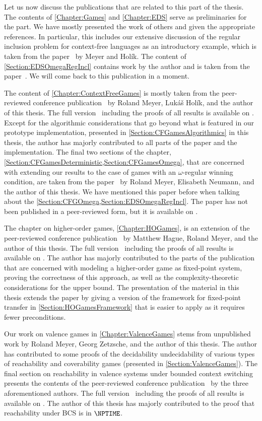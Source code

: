 \documentclass[../../diss.tex]{subfiles}
\begin{document}
Let us now discuss the publications that are related to this part of the thesis.
The contents of \cref{Chapter:Games} and \cref{Chapter:EDS} serve as preliminaries for the part.
We have mostly presented the work of others and given the appropriate references.
In particular, this includes our extensive discussion of the regular inclusion problem for context-free languages as an introductory example, which is taken from the paper~\cite{HolikM15} by Meyer and Holík.
The content of \cref{Section:EDSOmegaRegIncl} contains work by the author and is taken from the paper~\cite{MeyerMN17a}.
We will come back to this publication in a moment.

The content of \cref{Chapter:ContextFreeGames} is mostly taken from the peer-reviewed conference publication~\cite{HolikMM16} by Roland Meyer, Lukáš Holík, and the author of this thesis.
The full version~\cite{HolikMM16a} including the proofs of all results is available on \arXiv.
Except for the algorithmic considerations that go beyond what is featured in our prototype implementation, presented in \cref{Section:CFGamesAlgorithmics} in this thesis, the author has majorly contributed to all parts of the paper and the implementation.
The final two sections of the chapter, \cref{Section:CFGamesDeterministic,Section:CFGamesOmega}, that are concerned with extending our results to the case of games with an $\omega$-regular winning condition, are taken from the paper~\cite{MeyerMN17a} by Roland Meyer, Elisabeth Neumann, and the author of this thesis.
We have mentioned this paper before when talking about the \cref{Section:CFGOmega,Section:EDSOmegaRegIncl}.
The paper has not been published in a peer-reviewed form, but it is available on \arXiv.

The chapter on higher-order games, \cref{Chapter:HOGames}, is an extension of the peer-reviewed conference publication~\cite{HagueMM17} by Matthew Hague, Roland Meyer, and the author of this thesis.
The full version~\cite{HagueMM17a} including the proofs of all results is available on \arXiv.
The author has majorly contributed to the parts of the publication that are concerned with modeling a higher-order game as fixed-point system, proving the correctness of this approach, as well as the complexity-theoretic considerations for the upper bound.
The presentation of the material in this thesis extends the paper by giving a version of the framework for fixed-point transfer in \cref{Section:HOGamesFramework} that is easier to apply as it requires fewer preconditions.

Our work on valence games in \cref{Chapter:ValenceGames} stems from unpublished work by Roland Meyer, Georg Zetzsche, and the author of this thesis.
The author has contributed to some proofs of the decidability \resp undecidability of various types of reachability and coverability games (presented in \cref{Section:ValenceGames}).
The final section on reachability in valence systems under bounded context switching presents the contents of the peer-reviewed conference publication~\cite{MeyerMZ18} by the three aforementioned authors.
The full version~\cite{MeyerMZ18a} including the proofs of all results is available on \arXiv.
The author of this thesis has majorly contributed to the proof that reachability under BCS is in $\NPTIME$.
\end{document}
